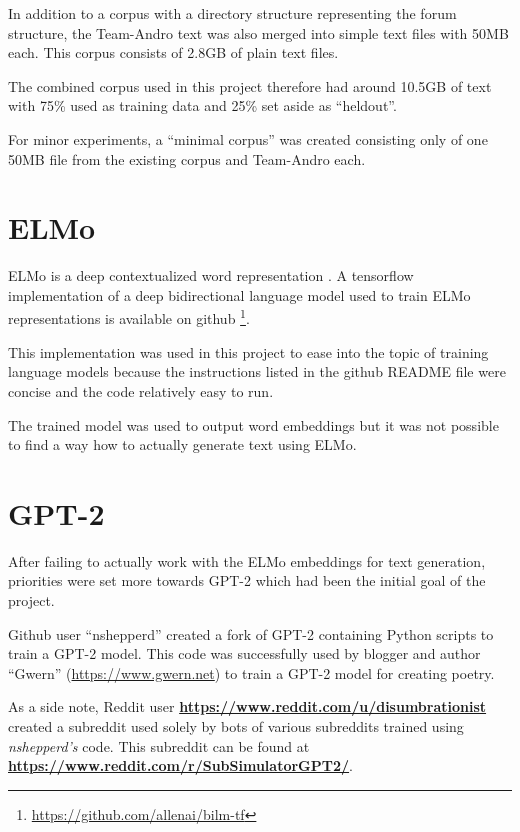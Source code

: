 \documentclass{scrartcl}
\newcommand{\burl}[1]{\textbf{\url{#1}}}
\begin{document}
In addition to a corpus with a directory structure representing the forum structure, the Team-Andro text was also merged into simple text files with 50MB each. This corpus consists of 2.8GB of plain text files.

The combined corpus used in this project therefore had around 10.5GB of text with 75\% used as training data and 25\% set aside as \enquote{heldout}.

For minor experiments, a \enquote{minimal corpus} was created consisting only of one 50MB file from the existing corpus and Team-Andro each.



\section{ELMo}

ELMo is a deep contextualized word representation \cite{Peters:2018}. A tensorflow implementation of a deep bidirectional language model used to train ELMo representations is available on github \footnote{\url{https://github.com/allenai/bilm-tf}}.

This implementation was used in this project to ease into the topic of training language models because the instructions listed in the github README file were concise and the code relatively easy to run.

The trained model was used to output word embeddings but it was not possible to find a way how to actually generate text using ELMo. 


\section{GPT-2}
After failing to actually work with the ELMo embeddings for text generation, priorities were set more towards GPT-2 \cite{radford2019language} which had been the initial goal of the project.




Github user \enquote{nshepperd} created a fork of GPT-2 containing Python scripts to train a GPT-2 model. This code was successfully used by blogger and author \enquote{Gwern} (\url{https://www.gwern.net}) to train a GPT-2 model for creating poetry.

As a side note, Reddit user \burl{https://www.reddit.com/u/disumbrationist} created a subreddit used solely by bots of various subreddits trained using \textit{nshepperd's} code. This subreddit can be found at \burl{https://www.reddit.com/r/SubSimulatorGPT2/}.
\end{document}
